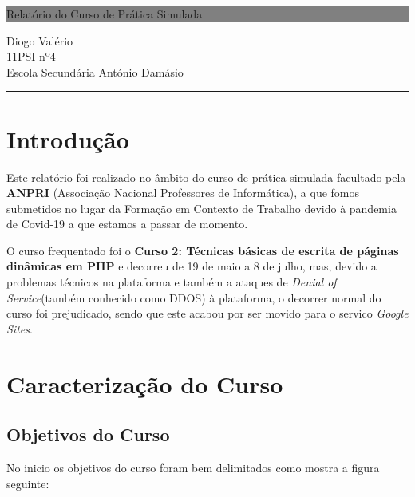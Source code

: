 \documentclass[12pt]{article}
\begin{document}
\begin{titlepage}

	\colorbox{grey}{
		\parbox[t]{0.93\textwidth}{ %
			\parbox[t]{0.91\textwidth}{ %
				\raggedleft
				\fontsize{50pt}{80pt}\selectfont
				\vspace{0.5cm}

				Relatório do Curso de Prática Simulada\\


				\vspace{0.5cm}
			}
		}
	}
	\vfill

	\parbox[t]{0.93\textwidth}{
		\raggedleft
		\large
		{\Large Diogo Valério}\\[4pt]
		11PSI nº4\\
		Escola Secundária António Damásio\\[4pt]
		\hfill\rule{0.6\linewidth}{1pt}
	}
\end{titlepage}


\tableofcontents
\newpage

\section{Introdução}
Este relatório foi realizado no âmbito do curso de prática simulada facultado pela \textbf{ANPRI} (Associação Nacional Professores de Informática), a que fomos submetidos no lugar da Formação em Contexto de Trabalho devido à pandemia de Covid-19 a que estamos a passar de momento.

O curso frequentado foi o \textbf{Curso 2: Técnicas básicas de escrita de páginas dinâmicas em PHP} e decorreu de 19 de maio a 8 de julho, mas, devido a problemas técnicos na plataforma e também a ataques de  \textit{Denial of Service}(também conhecido como DDOS) à plataforma, o decorrer normal do curso foi prejudicado, sendo que este acabou por ser movido para o servico \textit{Google Sites}.


\section{Caracterização do Curso}
\subsection{Objetivos do Curso}
No inicio os objetivos do curso foram bem delimitados como mostra a figura seguinte:
\end{document}
